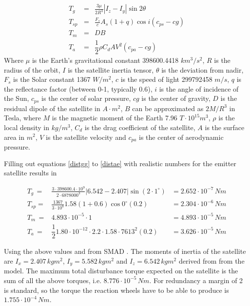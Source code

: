 \begin{eqnarray}
T_g \,&=& \frac{3\mu}{2R^3} \left|I_z - I_y \right| \sin{2\theta} \label{distgg} \\
T_{sp} &=& \frac{F_s}{c}A_s\left(1+q\right)\cos{i}\left(c_{ps}-cg\right) \label{distsr} \\
T_m \,&=& DB \label{distmf} \\
T_a \,&=& \dfrac{1}{2}\rho C_dAV^2 \left(c_{pa} -cg\right) \label{distae}
\end{eqnarray}
Where $\mu$ is the Earth's gravitational constant 398600.4418 $km^3/s^2$, $R$ is the radius of the orbit, $I$ is the satellite inertia tensor, $\theta$ is the deviation from nadir, $F_s$ is the Solar constant 1367 $W/m^2$, $c$ is the speed of light 299792458 $m/s$, $q$ is the reflectance factor (between 0-1, typically 0.6), $i$ is the angle of incidence of the Sun, $c_{ps}$ is the center of solar pressure, $cg$ is the center of gravity, $D$ is the residual dipole of the satellite in $A\cdot m^2$, $B$ can be approximated as $2M/R^3$ in Tesla, where $M$ is the magnetic moment of the Earth 7.96 $T\cdot 10^{15} m^3$, $\rho$ is the local density in $kg/m^3$, $C_d$ is the drag coefficient of the satellite, $A$ is the surface area in $m^2$, $V$ is the satellite velocity and $c_{pa}$ is the center of aerodynamic pressure.

Filling out equations \ref{distgg} to \ref{distae} with realistic numbers for the emitter satellite results in

\begin{eqnarray*}
T_g \,=& \frac{3\cdot 398600.4\cdot 10^9}{2\cdot 6878000^3} \left| 6.542 - 2.407 \right| \sin{\left(2\cdot 1^\circ \right)} &= 2.652\cdot 10^{-7}\,Nm\\
T_{sp} =& \frac{1367}{3\cdot 10^8}1.58\left(1+0.6\right)\cos{0^\circ}\left(0.2\right) &= 2.304 \cdot 10^{-6}\,Nm\\
T_m \,=& 4.893\cdot 10^{-5} \cdot 1  &= 4.893\cdot 10^{-5}\,Nm\\
T_a \,=& \dfrac{1}{2} 1.80 \cdot 10^{-12}\cdot 2.2\cdot 1.58 \cdot 7613^2 \left(0.2\right) &= 3.626 \cdot 10^{-5}\,Nm
\end{eqnarray*}

Using the above values and from SMAD \cite{larson}. The moments of inertia of the satellite are $I_x = 2.407\,kgm^2$,  $I_y = 5.582\,kgm^2$ and $I_z = 6.542\,kgm^2$ derived from  from the model. The maximum total disturbance torque expected on the satellite is the sum of all the above torques, i.e. $8.776 \cdot 10^{-5}\,Nm$. For redundancy a margin of 2 is standard, so the torque the reaction wheels have to be able to produce is $1.755\cdot 10^{-4}\,Nm$.

